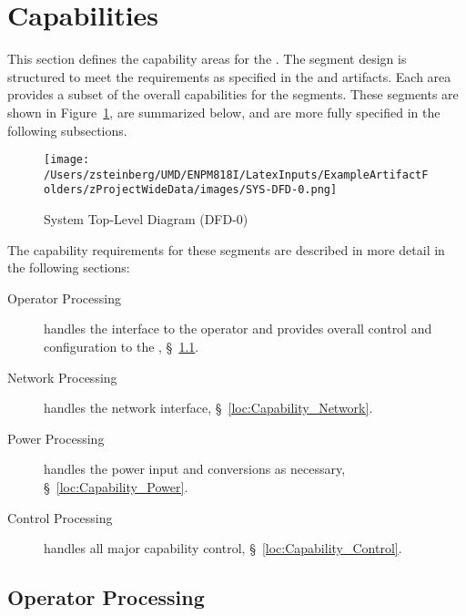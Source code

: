 \KNEADSECTIONNEWPAGE
\section{Capabilities}
\label{lab:sec_Capabilities}
% 


This section defines the capability areas for the \ThisSys.
The segment design is structured to meet the requirements as specified in the \SPS \citeExProjSPS and \SSS \citeExProjSSS artifacts.
Each area provides a subset of the overall capabilities for the \ThisSys segments.
These segments are shown in Figure~\ref{fig:DFD-0}, are summarized below, and are more fully specified in the following subsections.
\begin{figure}[htbp]
	\centering
		\texttt{[image: /Users/zsteinberg/UMD/ENPM818I/LatexInputs/ExampleArtifactFolders/zProjectWideData/images/SYS-DFD-0.png]}
	\caption[System Top-Level Diagram]{System Top-Level Diagram (DFD-0)}
	\label{fig:DFD-0}
\end{figure}
 
The capability requirements for these segments are described in more detail in the following sections:
\begin{description}
	\item[Operator Processing] handles the \HMI interface to the operator and provides overall control and configuration to the \ThisSys, \S~\ref{loc:Capability_Operator}.
	\item[Network Processing] handles the network interface, \S~\ref{loc:Capability_Network}.
	\item[Power Processing] handles the power input and conversions as necessary, \S~\ref{loc:Capability_Power}.
	\item[Control Processing] handles all major capability control, \S~\ref{loc:Capability_Control}.
\end{description}

\newpage
\subsection{Operator Processing}
\label{loc:Capability_Operator}

